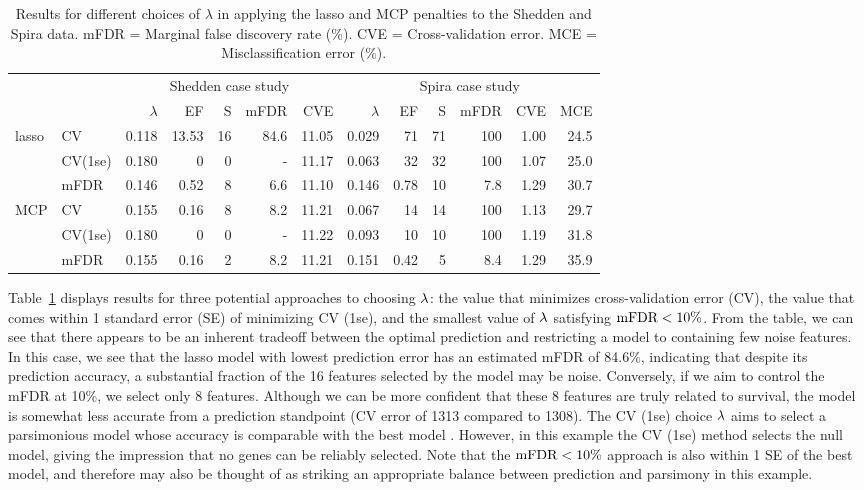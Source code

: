 \begin{table}[htb!]
\centering
\caption{\label{Tab:case-studies} Results for different choices of $\lambda$ in applying the lasso and MCP penalties to the Shedden and Spira data.  mFDR = Marginal false discovery rate (\%). CVE = Cross-validation error.  MCE = Misclassification error (\%).}
\vspace{.2cm}
\begin{tabular}{l l r r r r r @{\hskip 0.5in} r r r r r r}
  \hline
  & & \multicolumn{5}{c}{Shedden case study} & \multicolumn{6}{c}{Spira case study}\\
  & & $\lambda$ & EF & S & mFDR & CVE & $\lambda$ & EF & S & mFDR & CVE & MCE\\
  \hline
  lasso & CV & 0.118 & 13.53 & 16 & 84.6 & 11.05 & 0.029 & 71 & 71 & 100 & 1.00 & 24.5  \\
  & CV(1se) & 0.180  &  0 &  0 &  -  & 11.17 & 0.063 & 32 & 32 & 100 & 1.07 & 25.0  \\
  & mFDR & 0.146 & 0.52 & 8 & 6.6 & 11.10 & 0.146 & 0.78 & 10 & 7.8 & 1.29 & 30.7 \\
  MCP & CV & 0.155 & 0.16 & 8 & 8.2 & 11.21 & 0.067 & 14 & 14 & 100 & 1.13 & 29.7 \\
  & CV(1se) & 0.180 & 0 & 0 & - & 11.22 & 0.093 & 10 & 10 & 100 & 1.19 & 31.8  \\
  & mFDR & 0.155 & 0.16 & 2 & 8.2 & 11.21 & 0.151 & 0.42 & 5 & 8.4 & 1.29 & 35.9 \\
  \hline
\end{tabular}
\end{table}

Table~\ref{Tab:case-studies} displays results for three potential approaches to choosing $\lambda$: the value that minimizes cross-validation error (CV), the value that comes within 1 standard error (SE) of minimizing CV (1se), and the smallest value of $\lambda$ satisfying $\textrm{mFDR} < 10\%$.
From the table, we can see that there appears to be an inherent tradeoff between the optimal prediction and restricting a model to containing few noise features.
In this case, we see that the lasso model with lowest prediction error has an estimated mFDR of 84.6\%, indicating that despite its prediction accuracy, a substantial fraction of the 16 features selected by the model may be noise. Conversely, if we aim to control the mFDR at 10\%, we select only 8 features.  Although we can be more confident that these 8 features are truly related to survival, the model is somewhat less accurate from a prediction standpoint (CV error of 1313 compared to 1308).  The CV (1se) choice $\lambda$ aims to select a parsimonious model whose accuracy is comparable with the best model \citep{Hastie2009}. However, in this example the CV (1se) method selects the null model, giving the impression that no genes can be reliably selected.  Note that the $\textrm{mFDR} < 10\%$ approach is also within 1 SE of the best model, and therefore may also be thought of as striking an appropriate balance between prediction and parsimony in this example.

